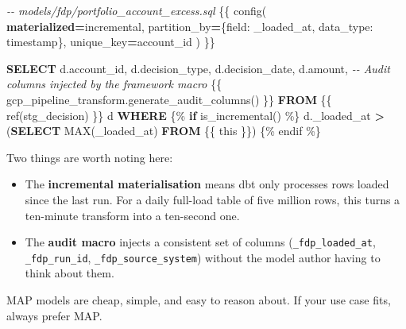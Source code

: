 \documentclass[
  11pt,
  british,
  oneside]{book}
\newenvironment{Shaded}{\begin{snugshade}}{\end{snugshade}}
\newcommand{\CommentTok}[1]{\textcolor[rgb]{0.56,0.35,0.01}{\textit{#1}}}
\newcommand{\ControlFlowTok}[1]{\textcolor[rgb]{0.13,0.29,0.53}{\textbf{#1}}}
\newcommand{\FunctionTok}[1]{\textcolor[rgb]{0.00,0.00,0.00}{#1}}
\newcommand{\KeywordTok}[1]{\textcolor[rgb]{0.13,0.29,0.53}{\textbf{#1}}}
\newcommand{\NormalTok}[1]{#1}
\newcommand{\OperatorTok}[1]{\textcolor[rgb]{0.81,0.36,0.00}{\textbf{#1}}}
\newcommand{\StringTok}[1]{\textcolor[rgb]{0.31,0.60,0.02}{#1}}
\providecommand{\tightlist}{%
  \setlength{\itemsep}{0pt}\setlength{\parskip}{0pt}}
\begin{document}
\begin{Shaded}
\begin{Highlighting}[]
\CommentTok{{-}{-} models/fdp/portfolio\_account\_excess.sql}
\NormalTok{\{\{ config(}
    \KeywordTok{materialized}\OperatorTok{=}\StringTok{\textquotesingle{}incremental\textquotesingle{}}\NormalTok{,}
\NormalTok{    partition\_by}\OperatorTok{=}\NormalTok{\{}\StringTok{\textquotesingle{}field\textquotesingle{}}\NormalTok{: }\StringTok{\textquotesingle{}\_loaded\_at\textquotesingle{}}\NormalTok{, }\StringTok{\textquotesingle{}data\_type\textquotesingle{}}\NormalTok{: }\StringTok{\textquotesingle{}timestamp\textquotesingle{}}\NormalTok{\},}
\NormalTok{    unique\_key}\OperatorTok{=}\StringTok{\textquotesingle{}account\_id\textquotesingle{}}
\NormalTok{) \}\}}

\KeywordTok{SELECT}
\NormalTok{    d.account\_id,}
\NormalTok{    d.decision\_type,}
\NormalTok{    d.decision\_date,}
\NormalTok{    d.amount,}
    \CommentTok{{-}{-} Audit columns injected by the framework macro}
\NormalTok{    \{\{ gcp\_pipeline\_transform.generate\_audit\_columns() \}\}}
\KeywordTok{FROM}\NormalTok{ \{\{ }\FunctionTok{ref}\NormalTok{(}\StringTok{\textquotesingle{}stg\_decision\textquotesingle{}}\NormalTok{) \}\} d}
\KeywordTok{WHERE}
\NormalTok{    \{\% }\ControlFlowTok{if}\NormalTok{ is\_incremental() \%\}}
\NormalTok{      d.\_loaded\_at }\OperatorTok{\textgreater{}}\NormalTok{ (}\KeywordTok{SELECT} \FunctionTok{MAX}\NormalTok{(\_loaded\_at) }\KeywordTok{FROM}\NormalTok{ \{\{ this \}\})}
\NormalTok{    \{\% endif \%\}}
\end{Highlighting}
\end{Shaded}

Two things are worth noting here:

\begin{itemize}
\tightlist
\item
  The \textbf{incremental materialisation} means dbt only processes rows
  loaded since the last run. For a daily full-load table of five million
  rows, this turns a ten-minute transform into a ten-second one.
\item
  The \textbf{audit macro} injects a consistent set of columns
  (\texttt{\_fdp\_loaded\_at}, \texttt{\_fdp\_run\_id},
  \texttt{\_fdp\_source\_system}) without the model author having to
  think about them.
\end{itemize}

MAP models are cheap, simple, and easy to reason about. If your use case
fits, always prefer MAP.
\end{document}
